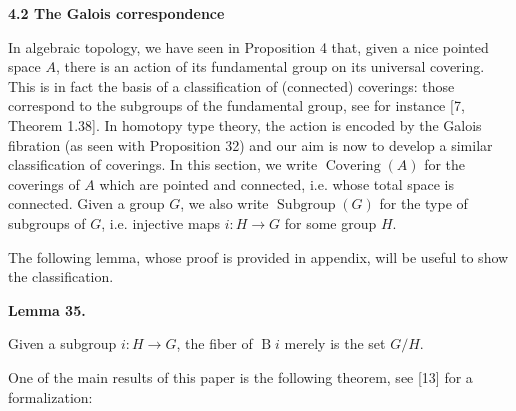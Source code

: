  
 
 
 
\par\medskip\noindent\textbf{4.2 The Galois correspondence}\par
 
 
In algebraic topology, we have seen in Proposition 4 that, given a nice pointed space $A$, there is an action of its fundamental group on its universal covering. This is in fact the basis of a classification of (connected) coverings: those correspond to the subgroups of the fundamental group, see for instance [7, Theorem 1.38]. In homotopy type theory, the action is encoded by the Galois fibration (as seen with Proposition 32) and our aim is now to develop a similar classification of coverings. In this section, we write $\operatorname{Covering}(A)$ for the coverings of $A$ which are pointed and connected, i.e. whose total space is connected. Given a group $G$, we also write $\operatorname{Subgroup}(G)$ for the type of subgroups of $G$, i.e. injective maps $i:H\to G$ for some group $H$.\par
 
 
 
The following lemma, whose proof is provided in appendix, will be useful to show the classification.\par
 
 
 
\par\medskip\noindent\textbf{Lemma 35.}\par
 
 
Given a subgroup $i:H\to G$, the fiber of $\operatorname{B}i$ merely is the set $G/H$.\par
 
 
 
 
One of the main results of this paper is the following theorem, see [13] for a formalization:\par
 
 
